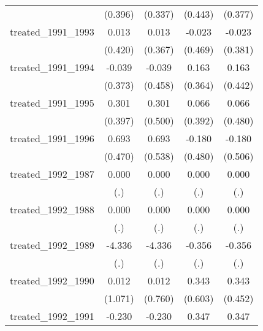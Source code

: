 {\begin{tabular}{l*{4}{c}}
            &     (0.396)         &     (0.337)         &     (0.443)         &     (0.377)         \\
[1em]
treated\_1991\_1993&       0.013         &       0.013         &      -0.023         &      -0.023         \\
            &     (0.420)         &     (0.367)         &     (0.469)         &     (0.381)         \\
[1em]
treated\_1991\_1994&      -0.039         &      -0.039         &       0.163         &       0.163         \\
            &     (0.373)         &     (0.458)         &     (0.364)         &     (0.442)         \\
[1em]
treated\_1991\_1995&       0.301         &       0.301         &       0.066         &       0.066         \\
            &     (0.397)         &     (0.500)         &     (0.392)         &     (0.480)         \\
[1em]
treated\_1991\_1996&       0.693         &       0.693         &      -0.180         &      -0.180         \\
            &     (0.470)         &     (0.538)         &     (0.480)         &     (0.506)         \\
[1em]
treated\_1992\_1987&       0.000         &       0.000         &       0.000         &       0.000         \\
            &         (.)         &         (.)         &         (.)         &         (.)         \\
[1em]
treated\_1992\_1988&       0.000         &       0.000         &       0.000         &       0.000         \\
            &         (.)         &         (.)         &         (.)         &         (.)         \\
[1em]
treated\_1992\_1989&      -4.336         &      -4.336         &      -0.356         &      -0.356         \\
            &         (.)         &         (.)         &         (.)         &         (.)         \\
[1em]
treated\_1992\_1990&       0.012         &       0.012         &       0.343         &       0.343         \\
            &     (1.071)         &     (0.760)         &     (0.603)         &     (0.452)         \\
[1em]
treated\_1992\_1991&      -0.230         &      -0.230         &       0.347         &       0.347         \\

\end{tabular}}
